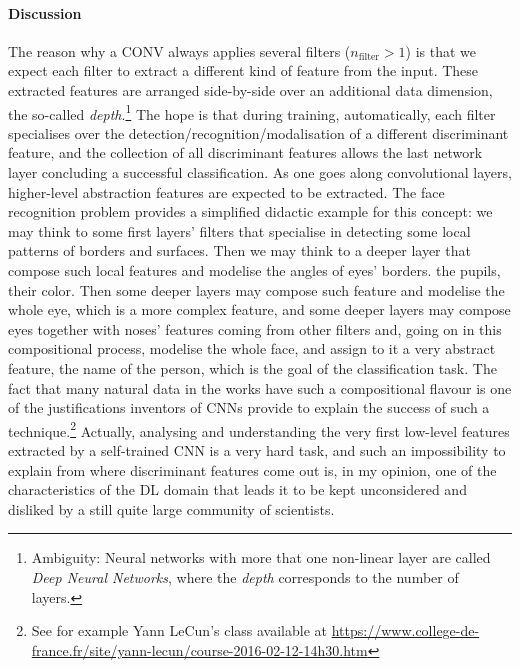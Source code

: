 \paragraph*{Discussion}
The reason why a CONV always applies several filters (\ie $n_{\text{filter}}>1$) is
that we expect each filter to extract a different kind of feature from
the input. These extracted features are arranged
side-by-side over an additional data dimension, the so-called
\emph{depth}.\footnote{Ambiguity: Neural networks with more that one non-linear layer are called
\emph{Deep Neural Networks}, where the \emph{depth} corresponds to the number of
layers.} The hope is that during training, automatically, each filter specialises over the detection/recognition/modalisation of a different discriminant feature, and the collection of all discriminant features allows the last network layer concluding a successful classification.  As one goes along convolutional layers, higher-level abstraction
features are expected to be extracted.  The face recognition problem provides a simplified didactic example for this concept: we may think to some first layers' filters that specialise in detecting some local patterns of borders and surfaces. Then we may think to a deeper layer that compose such local features and modelise the angles of eyes' borders. the pupils, their color. Then some deeper layers may compose such feature and modelise  the whole eye, which is a more complex feature, and some deeper layers may compose eyes together with noses' features coming from other filters and, going on in this compositional process, modelise the whole face, and assign to it a very abstract feature, \ie the name of the person, which is the goal of the classification task. The fact that many natural data in the works have such a compositional flavour is one of the justifications inventors of CNNs provide to explain the success of such a technique.\footnote{See for example Yann LeCun's class available at \url{https://www.college-de-france.fr/site/yann-lecun/course-2016-02-12-14h30.htm}}  Actually, analysing and understanding the very first low-level features extracted by a self-trained CNN is a very hard task, and such an impossibility to explain from where discriminant features come out is, in my opinion, one of the characteristics of the DL domain that leads it to be kept unconsidered and disliked by a still quite large community of scientists. 

